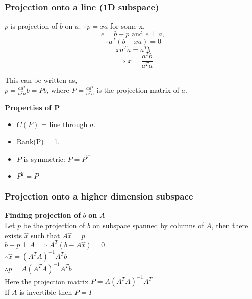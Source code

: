 \subsubsection{Projection onto a line (1D subspace)}


$p$ is projection of $b$ on $a$. $\therefore p = xa $ for some x.\\

$$e = b - p \text{ and } e \perp  a,$$
$$\therefore a^T(b-xa) = 0$$
$$xa^Ta = a^Tb$$
$$\implies x = \frac{a^Tb}{a^Ta}$$
\begin{center}
\end{center}

This can be written as,\\
$p = \frac{aa^T}{a^Ta}b = Pb$, where $P = \frac{aa^T}{a^Ta}$ is the projection matrix of $a$.
	

\textbf{Properties of P}\\
\begin{itemize}
	\item $C(P)$ = line through $a$.
	\item Rank(P) = 1.
	\item $P$ is symmetric: $P = P^T$
	\item $P^2=P$
\end{itemize}

\subsubsection{Projection onto a higher dimension subspace}

\textbf{Finding projection of } $b$ \textbf{on} $A$\\
Let $p$ be the projection of $b$ on subspace spanned by columns of $A$, 
then there exists $\hat{x}$ such that $A\hat{x} = p$\\
$b - p \perp A \implies A^T(b-A\hat{x}) = 0$ \\
$\therefore \hat{x} = (A^TA)^{-1}A^Tb$\\
$\therefore p = A(A^TA)^{-1}A^Tb$\\
Here the projection matrix $P = A(A^TA)^{-1}A^T$\\
If $A$ is invertible then $P = I$ 

